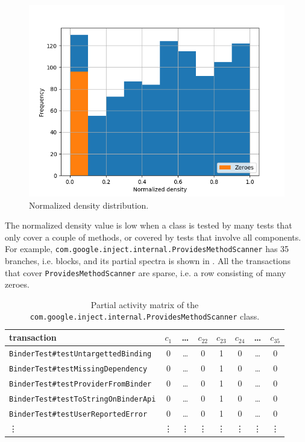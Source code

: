 \documentclass[twoside,a4paper,11pt]{memoir}
\begin{document}
\begin{figure}
    \centering
    \includegraphics[width=\linewidth]{figures/histogram_normalized_density}
    \caption{Normalized density distribution.}
    \label{fig:hist_normalized_density}
\end{figure}

The normalized density value is low when a class is tested by many tests that only cover a couple of methods, or covered by tests that involve all components.
For example, \texttt{com.google.inject.internal.ProvidesMethodScanner} has 35 branches, i.e. blocks, and its partial spectra is shown in .
All the transactions that cover \texttt{Provides\-Method\-Scanner} are sparse, i.e. a row consisting of many zeroes.

\begin{table}[]
\scriptsize
\centering
\caption{Partial activity matrix of the \texttt{com.google.\-inject.\-internal.\-Provides\-Method\-Scanner} class.}
\label{tab:providesmethodscanner}
\begin{tabular}{l|ccccccc}
transaction & $c_1$ & \dots & $c_{22}$ & $c_{23}$ & $c_{24}$ & \dots & $c_{35}$ \\ \hline
\texttt{BinderTest\#testUntargettedBinding} & 0 & \dots & 0 & 1 & 0 & \dots & 0 \\
\texttt{BinderTest\#testMissingDependency} & 0 & \dots & 0 & 1 & 0 & \dots & 0 \\
\texttt{BinderTest\#testProviderFromBinder} & 0 & \dots & 0 & 1 & 0 & \dots & 0 \\
\texttt{BinderTest\#testToStringOnBinderApi} & 0 & \dots & 0 & 1 & 0 & \dots & 0 \\
\texttt{BinderTest\#testUserReportedError} & 0 & \dots & 0 & 1 & 0 & \dots & 0 \\
\vdots & \vdots & \vdots & \vdots & \vdots & \vdots & \vdots & \vdots
\end{tabular}
\end{table}
\end{document}
